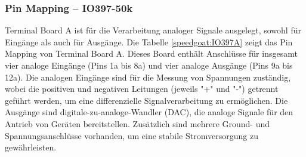 \subsubsection{Pin Mapping – IO397-50k}

Terminal Board A ist für die Verarbeitung analoger Signale ausgelegt, sowohl für Eingänge als auch für Ausgänge. Die Tabelle \ref{speedgoat:IO397A} zeigt das Pin Mapping von Terminal Board A. Dieses Board enthält Anschlüsse für insgesamt vier analoge Eingänge (Pins 1a bis 8a) und vier analoge Ausgänge (Pins 9a bis 12a). Die analogen Eingänge sind für die Messung von Spannungen zuständig, wobei die positiven und negativen Leitungen (jeweils "+" und "-") getrennt geführt werden, um eine differenzielle Signalverarbeitung zu ermöglichen. Die Ausgänge sind digitale-zu-analoge-Wandler (DAC), die analoge Signale für den Antrieb von Geräten bereitstellen. Zusätzlich sind mehrere Ground- und Spannungsanschlüsse vorhanden, um eine stabile Stromversorgung zu gewährleisten.
